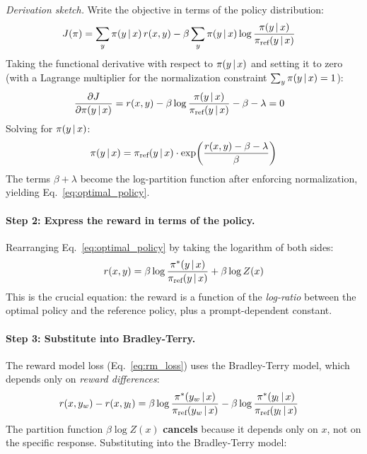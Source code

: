 \textit{Derivation sketch.}  Write the objective in terms of the policy
distribution:
\begin{align}
J(\pi) &= \sum_y \pi(y \,|\, x) \, r(x, y)
  - \beta \sum_y \pi(y \,|\, x) \log \frac{\pi(y \,|\, x)}{\pi_{\text{ref}}(y \,|\, x)}
\label{eq:rlhf_expanded}
\end{align}
Taking the functional derivative with respect to $\pi(y \,|\, x)$ and
setting it to zero (with a Lagrange multiplier for the normalization
constraint $\sum_y \pi(y \,|\, x) = 1$):
\begin{align}
\frac{\partial J}{\partial \pi(y \,|\, x)}
&= r(x, y) - \beta \log \frac{\pi(y \,|\, x)}{\pi_{\text{ref}}(y \,|\, x)} - \beta - \lambda = 0
\end{align}
Solving for $\pi(y \,|\, x)$:
\[
\pi(y \,|\, x) = \pi_{\text{ref}}(y \,|\, x) \cdot \exp\!\left(\frac{r(x,y) - \beta - \lambda}{\beta}\right)
\]
The terms $\beta + \lambda$ become the log-partition function after
enforcing normalization, yielding Eq.~\eqref{eq:optimal_policy}.

\paragraph{Step 2: Express the reward in terms of the policy.}
Rearranging Eq.~\eqref{eq:optimal_policy} by taking the logarithm of both
sides:
\begin{equation}
r(x, y) = \beta \log \frac{\pi^*(y \,|\, x)}{\pi_{\text{ref}}(y \,|\, x)} + \beta \log Z(x)
\label{eq:reward_from_policy}
\end{equation}
This is the crucial equation: the reward is a function of the
\emph{log-ratio} between the optimal policy and the reference policy, plus
a prompt-dependent constant.

\paragraph{Step 3: Substitute into Bradley-Terry.}
The reward model loss (Eq.~\ref{eq:rm_loss}) uses the Bradley-Terry
model, which depends only on \emph{reward differences}:
\begin{align}
r(x, y_w) - r(x, y_l)
&= \beta \log \frac{\pi^*(y_w \,|\, x)}{\pi_{\text{ref}}(y_w \,|\, x)}
 - \beta \log \frac{\pi^*(y_l \,|\, x)}{\pi_{\text{ref}}(y_l \,|\, x)}
\label{eq:reward_diff}
\end{align}
The partition function $\beta \log Z(x)$ \textbf{cancels} because it
depends only on $x$, not on the specific response.  Substituting into the
Bradley-Terry model:

